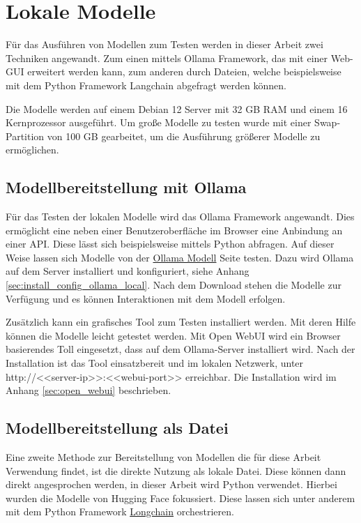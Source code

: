 \section{Lokale Modelle}
Für das Ausführen von Modellen zum Testen werden in dieser Arbeit zwei Techniken angewandt. Zum einen mittels Ollama Framework, das mit einer Web-GUI erweitert werden kann, zum anderen durch Dateien, welche beispielsweise mit dem Python Framework Langchain abgefragt werden können.\vspace{0.2cm}

Die Modelle werden auf einem Debian 12 Server mit 32 GB RAM und einem 16 Kernprozessor ausgeführt. Um große Modelle zu testen wurde mit einer Swap-Partition von 100 GB gearbeitet, um die Ausführung größerer Modelle zu ermöglichen.\vspace{0.2cm}

\subsection{Modellbereitstellung mit Ollama}
Für das Testen der lokalen Modelle wird das Ollama Framework angewandt. Dies ermöglicht eine neben einer Benutzeroberfläche im Browser eine Anbindung an einer API. Diese lässt sich beispielsweise mittels Python abfragen. Auf dieser Weise lassen sich Modelle von der \href{https://ollama.com/search}{Ollama Modell} Seite testen. Dazu wird Ollama auf dem Server installiert und konfiguriert, siehe Anhang \ref{sec:install_config_ollama_local}. Nach dem Download stehen die Modelle zur Verfügung und es können Interaktionen mit dem Modell erfolgen.\vspace{0.2cm}

Zusätzlich kann ein grafisches Tool zum Testen installiert werden. Mit deren Hilfe können die Modelle leicht getestet werden. Mit Open WebUI wird ein Browser basierendes Toll eingesetzt, dass auf dem Ollama-Server installiert wird. Nach der Installation ist das Tool einsatzbereit und im lokalen Netzwerk, unter http://<<server-ip>>:<<webui-port>> erreichbar. Die Installation wird im Anhang \ref{sec:open_webui} beschrieben.


\subsection{Modellbereitstellung als Datei}
Eine zweite Methode zur Bereitstellung von Modellen die für diese Arbeit Verwendung findet, ist die direkte Nutzung als lokale Datei. Diese können dann direkt angesprochen werden, in dieser Arbeit wird Python verwendet. Hierbei wurden die Modelle von Hugging Face fokussiert. Diese lassen sich unter anderem mit dem Python Framework \href{https://pypi.org/project/langchain/}{Longchain} orchestrieren.\vspace{0.2cm}

